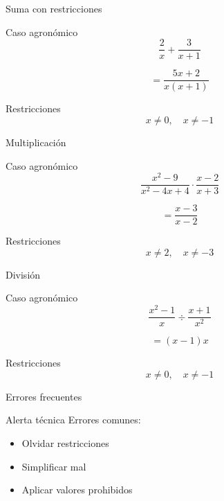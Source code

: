 \documentclass[aspectratio=169,handout,11pt]{beamer}
\newenvironment{ejemplo}{\begin{exampleblock}{Caso agronómico}}{\end{exampleblock}}
\newenvironment{alerta}{\begin{alertblock}{Alerta técnica}}{\end{alertblock}}
\begin{document}
	\begin{frame}{Suma con restricciones}
		\begin{ejemplo}
			\[
			\frac{2}{x}+\frac{3}{x+1}
			\]
		\end{ejemplo}
		
		\pause
		
		\[
		= \frac{5x+2}{x(x+1)}
		\]
		
		\pause
		
		\begin{block}{Restricciones}
			\[
			x \neq 0, \quad x \neq -1
			\]
		\end{block}
	\end{frame}
	
	\begin{frame}{Multiplicación}
		\begin{ejemplo}
			\[
			\frac{x^2-9}{x^2-4x+4}\cdot\frac{x-2}{x+3}
			\]
		\end{ejemplo}
		
		\pause
		
		\[
		= \frac{x-3}{x-2}
		\]
		
		\pause
		
		\begin{block}{Restricciones}
			\[
			x \neq 2, \quad x \neq -3
			\]
		\end{block}
	\end{frame}
	
	\begin{frame}{División}
		\begin{ejemplo}
			\[
			\frac{x^2-1}{x}\div\frac{x+1}{x^2}
			\]
		\end{ejemplo}
		
		\pause
		
		\[
		= (x-1)x
		\]
		
		\pause
		
		\begin{block}{Restricciones}
			\[
			x \neq 0, \quad x \neq -1
			\]
		\end{block}
	\end{frame}
	
	\begin{frame}{Errores frecuentes}
		\begin{alerta}
			Errores comunes:
		\end{alerta}
		
		\begin{itemize}[<+->]
			\item Olvidar restricciones
			\item Simplificar mal
			\item Aplicar valores prohibidos
		\end{itemize}
	\end{frame}
	
\end{document}
